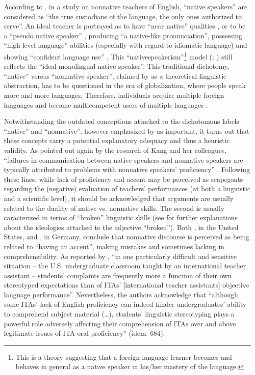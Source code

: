 \documentclass[output=paper]{../langscibook}
\begin{document}
According to \citet[284]{Rajagopalan2005}, in a study on nonnative teachers of English, “native speakers” are considered as “the true custodians of the language, the only ones authorized to serve”. An ideal teacher is portrayed as to have “near native” qualities \citep{Coppieters1987}, or to be a “pseudo native speaker” \citep{Medgyes1994}, producing “a native-like pronunciation”, possessing “high-level language” abilities (especially with regard to idiomatic language) and showing “confident language use” \citep{Inbar-Lourie2005}. This ``nativespeakerism''\footnote{This is a theory suggesting that a foreign language learner becomes and behaves in general as a native speaker in his/her mastery of the language.} model (\citealt{Gnutzmann1999}; \citealt{Holliday2006}) still reflects the “ideal monolingual native speaker”. This traditional dichotomy, “native” versus “nonnative speaker”, claimed by \citet{Derivry2006} as a theoretical linguistic abstraction, has to be questioned in the era of globalization, where people speak more and more languages. Therefore, individuals acquire multiple foreign languages and become multicompetent users of multiple languages \citep{Cook2002}.

Notwithstanding the outdated conceptions attached to the dichotomous labels “native” and “nonnative”, however emphasized by \citet{Derivry2006} as important, it turns out that these concepts carry a potential explanatory adequacy and thus a heuristic validity. As pointed out again by the research of Kang and her colleagues, “failures in communication between native speakers and nonnative speakers are typically attributed to problems with nonnative speakers’ proficiency” \citep[681]{KangEtAl2015}. Following these lines, while lack of proficiency and accent may be perceived as scapegoats regarding the (negative) evaluation of teachers’ performances (at both a linguistic and a scientific level), it should be acknowledged that arguments are usually related to the duality of native vs. nonnative skills. The second is usually caracterized in terms of “broken” linguistic skills (see \citealt{LindemannMoran2017} for further explanations about the ideologies attached to the adjective “broken”). Both \citet{LindemannMoran2017}, in the United States, and \citet{Melo-Pfeifer2017}, in Germany, conclude that nonnative discourse is perceived as being related to “having an accent”, making mistakes and sometimes lacking in comprehensibility. As reported by \citet[682]{KangEtAl2015}, “in one particularly difficult and sensitive situation – the U.S. undergraduate classroom taught by an international teacher assistant – students’ complaints are frequently more a function of their own stereotyped expectations than of ITAs’ [international teacher assistants] objective language performance”. Nevertheless, the authors acknowledge that “although some ITAs’ lack of English proficiency can indeed hinder undergraduates’ ability to comprehend subject material (…), students’ linguistic stereotyping plays a powerful role adversely affecting their comprehension of ITAs over and above legitimate issues of ITA oral proficiency” (idem: 684).
\end{document}
